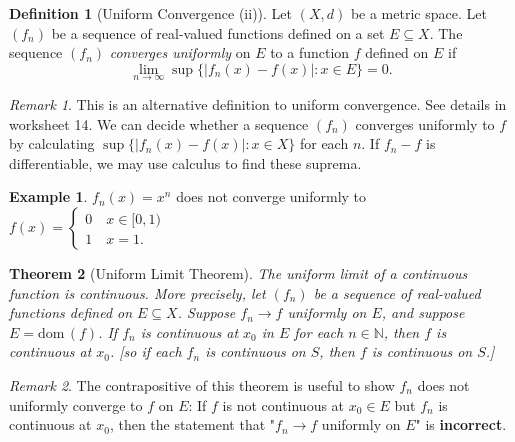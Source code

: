 \documentclass[12pt, lettersize]{book}
\theoremstyle{plain}
\newtheorem{thm}{Theorem}[section]
\theoremstyle{definition}
\newtheorem{dfn}[thm]{Definition}
\newtheorem*{eg}{Example}
\theoremstyle{remark}
\newtheorem*{rem}{Remark}
\newcommand{\N}{\mathbb{N}}
\newcommand{\dom}{\text{dom}\,}
\begin{document}
		\begin{dfn}[Uniform Convergence (ii)]
			Let $(X,d)$ be a metric space. Let $(f_n)$ be a sequence of real-valued functions defined on a set $E\subseteq X$. The sequence $(f_n)$ \emph{converges uniformly} on $E$ to a function $f$ defined on $E$ if
			\begin{displaymath}
				\lim\limits_{n\rightarrow\infty}\sup\{|f_n(x)-f(x)|: x\in E\}=0.
			\end{displaymath}
		\end{dfn}
		\begin{rem}
			This is an alternative definition to uniform convergence. See details in worksheet 14. We can decide whether a sequence $(f_n)$ converges uniformly to $f$ by calculating $\sup\{|f_n(x)-f(x)|: x\in X\}$ for each $n$. If $f_n-f$ is differentiable, we may use calculus to find these suprema.
		\end{rem}
		
		\begin{eg}
			$f_n(x)=x^n$ does not converge uniformly to $f(x)=\begin{cases}
				0\quad x\in[0,1)\\1\quad x=1.
			\end{cases}$
		\end{eg}
		
		\setcounter{equation}{0}
		\begin{thm}[Uniform Limit Theorem]\label{thm:24.3}
			The uniform limit of a continuous function is continuous. More precisely, let $(f_n)$ be a sequence of real-valued functions
			defined on $E\subseteq X$. Suppose $f_n\rightarrow f$ uniformly on $E$, and suppose $E=\dom(f)$. If $f_n$ is
			continuous at $x_0$ in $E$ for each $n\in\N$, then $f$ is continuous at $x_0$. [so if each $f_n$ is continuous on $S$, then $f$ is continuous on $S$.]
		\end{thm}
		\begin{rem}
			The contrapositive of this theorem is useful to show $f_n$ does not uniformly converge to $f$ on $E$:
			If $f$ is not continuous at $x_0\in E$ but $f_n$ is continuous at $x_0$, then the statement that "$f_n\rightarrow f$ uniformly on $E$" is \textbf{incorrect}.
		\end{rem}
		
		\newpage
		
\end{document}
